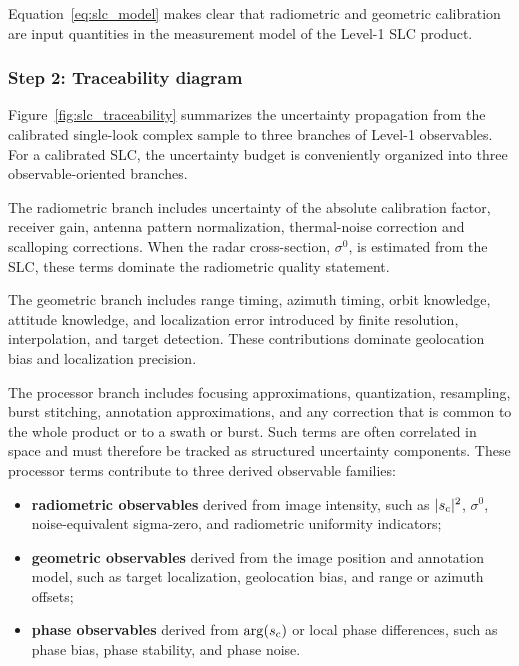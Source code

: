 Equation~\ref{eq:slc_model} makes clear that radiometric and geometric
calibration are input quantities in the measurement model of the Level-1 \ac{SLC} product.



\subsubsection{Step 2: Traceability diagram}

Figure~\ref{fig:slc_traceability} summarizes the uncertainty propagation from
the calibrated single-look complex sample to three branches of Level-1
observables. For a calibrated \ac{SLC}, the uncertainty budget is conveniently organized into three observable-oriented branches.

The radiometric branch includes uncertainty of the absolute calibration factor,
receiver gain, antenna pattern normalization, thermal-noise correction and 
scalloping corrections. When the radar cross-section, $\sigma^{0}$, is estimated from the \ac{SLC}, these terms dominate the radiometric quality statement.

The geometric branch includes range timing, azimuth timing, orbit knowledge,
attitude knowledge, and localization error introduced by finite resolution,
interpolation, and target detection. These contributions dominate geolocation
bias and localization precision.

The processor branch includes focusing approximations, quantization,
resampling, burst stitching, annotation approximations, and any correction that
is common to the whole product or to a swath or burst. Such terms are often
correlated in space and must therefore be tracked as structured uncertainty
components. These processor terms contribute to three derived observable families:

\begin{itemize}
  \item \textbf{radiometric observables} derived from image intensity, such as
  $|s_{\rm c}|^{2}$, $\sigma^{0}$, noise-equivalent sigma-zero, and radiometric
  uniformity indicators;
  \item \textbf{geometric observables} derived from the image position and
  annotation model, such as target localization, geolocation bias, and range or
  azimuth offsets;
  \item \textbf{phase observables} derived from $\arg(s_{\rm c})$ or local
  phase differences, such as phase bias, phase stability, and phase noise.
\end{itemize}

